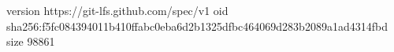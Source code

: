 version https://git-lfs.github.com/spec/v1
oid sha256:f5fc084394011b410ffabc0eba6d2b1325dfbc464069d283b2089a1ad4314fbd
size 98861
